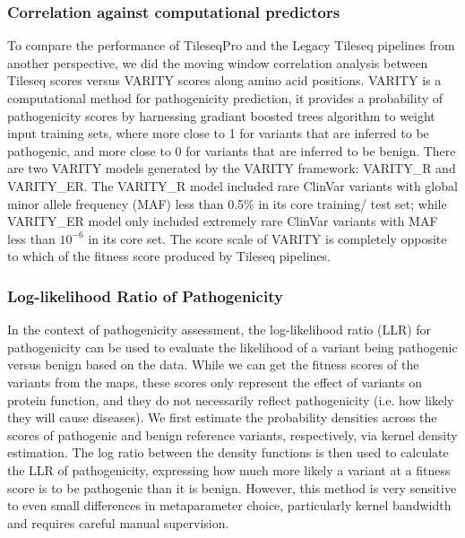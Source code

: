 \documentclass{article}
\begin{document}
\subsubsection{Correlation against computational predictors}
To compare the performance of TileseqPro and the Legacy Tileseq pipelines from another perspective, we did the moving window correlation analysis between Tileseq scores versus VARITY\cite{wu_improved_2021} scores along amino acid positions. VARITY is a computational method for pathogenicity prediction, it provides a probability of pathogenicity scores by harnessing gradiant boosted trees algorithm to weight input training sets, where more close to 1 for variants that are inferred to be pathogenic, and more close to 0 for variants that are inferred to be benign. 
There are two VARITY models generated by the VARITY framework: VARITY\_R and VARITY\_ER. The VARITY\_R model included rare ClinVar\cite{10.1093/nar/gkx1153} variants with global minor allele frequency (MAF) less than 0.5\% in its core training/ test set; while VARITY\_ER model only included extremely rare ClinVar variants with MAF less than ${10}^{-6}$ in its core set. The score scale of VARITY is completely opposite to which of the fitness score produced by Tileseq pipelines.


\subsubsection{Log-likelihood Ratio of Pathogenicity}

In the context of pathogenicity assessment, the log-likelihood ratio (LLR) for pathogenicity\cite{weile_shifting_2021} can be used to evaluate the likelihood of a variant being pathogenic versus benign based on the data. While we can get the fitness scores of the variants from the maps, these scores only represent the effect of variants on protein function, and they do not necessarily reflect pathogenicity (i.e. how likely they will cause diseases)\cite{floyd_proactive_2023}. We first estimate the probability densities across the scores of pathogenic and benign reference variants, respectively, via kernel density estimation. The log ratio between the density functions is then used to calculate the LLR of pathogenicity, expressing how much more likely a variant at a fitness score is to be pathogenic than it is benign\cite{floyd_proactive_2023}. However, this method is very sensitive to even small differences in metaparameter choice, particularly kernel bandwidth and requires careful manual supervision.
\end{document}
